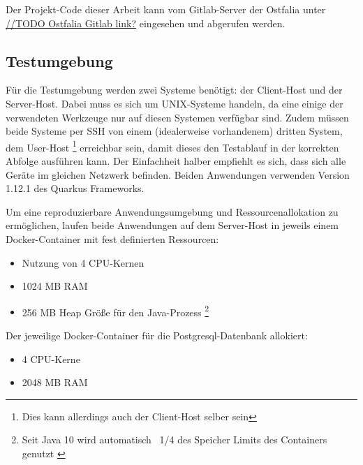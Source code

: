 Der Projekt-Code dieser Arbeit kann vom Gitlab-Server der Ostfalia unter
\url{//TODO Ostfalia Gitlab link?} eingesehen und abgerufen werden.

\subsection{Testumgebung}
\label{section:testumgebung}
Für die Testumgebung werden zwei Systeme benötigt: der Client-Host und der Server-Host.
Dabei muss es sich um UNIX-Systeme handeln, da eine einige der verwendeten Werkzeuge nur
auf diesen Systemen verfügbar sind.
Zudem müssen beide Systeme per SSH von einem (idealerweise vorhandenem) dritten System, dem User-Host
\footnote{Dies kann allerdings auch der Client-Host selber sein}
erreichbar sein, damit dieses den Testablauf in der korrekten Abfolge ausführen kann.
Der Einfachheit halber empfiehlt es sich, dass sich alle Geräte im gleichen Netzwerk befinden.
Beiden Anwendungen verwenden Version 1.12.1 des Quarkus Frameworks.

Um eine reproduzierbare Anwendungsumgebung und Ressourcenallokation zu ermöglichen, laufen beide Anwendungen auf dem Server-Host in
jeweils einem Docker-Container mit fest definierten Ressourcen:
\begin{itemize}
    \item Nutzung von 4 CPU-Kernen
    \item 1024 MB RAM
    \item 256 MB Heap Größe für den Java-Prozess
          \footnote{Seit Java 10 wird automatisch ~1/4 des Speicher Limits des Containers genutzt \cite{Java10ReleaseNotes}}
\end{itemize}
Der jeweilige Docker-Container für die Postgresql-Datenbank allokiert:
\begin{itemize}
    \item 4 CPU-Kerne
    \item 2048 MB RAM
\end{itemize}

